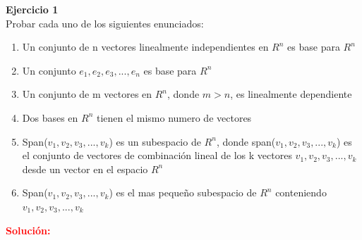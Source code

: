 \documentclass[12pt]{article}
\begin{document}
\noindent \textbf{Ejercicio 1}\\
Probar cada uno de los siguientes enunciados:
\begin{enumerate}
    \item Un conjunto de n vectores linealmente independientes en $R^{n}$ es base para $R^{n}$
    \item Un conjunto ${e_{1}, e_{2}, e_{3}, ..., e_{n}}$ es base para $R^{n}$
    \item Un conjunto de m vectores en $R^{n}$, donde $m > n$, es linealmente dependiente
    \item Dos bases en $R^{n}$ tienen el mismo numero de vectores
    \item Span($v_{1},v_{2},v_{3}, ..., v_{k}$) es un subespacio de $R^{n}$, donde span($v_{1},v_{2},v_{3}, ..., v_{k}$) es el conjunto de vectores de combinación lineal de los k vectores $v_{1},v_{2},v_{3}, ..., v_{k}$ desde un vector en el espacio $R^{n}$
    \item Span($v_{1},v_{2},v_{3}, ..., v_{k}$) es el mas pequeño subespacio de $R^{n}$ conteniendo $v_{1},v_{2},v_{3}, ..., v_{k}$
\end{enumerate}
\noindent \textcolor{red}{\bf Solución:}
\end{document}

